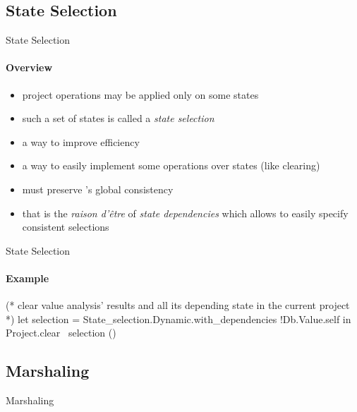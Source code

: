 
\subsection{State Selection}

\begin{frame}{State Selection}
  \framesubtitle{Overview}
  \begin{itemize}
  \item project operations may be applied only on some states
  \item such a set of states is called a \emph{state selection}
  \item a way to improve efficiency
  \item a way to easily implement some operations over states (like clearing)
  \item must preserve \framac's global consistency
  \item that is the \emph{raison d'\^etre} of \emph{state dependencies} which
    allows to easily specify consistent selections
  \end{itemize}
\end{frame}


\begin{frame}[fragile]{State Selection}
  \framesubtitle{Example}
  
  \begin{ocamlcode}
(* clear value analysis' results
   and all its depending state
   in the current project *)
let selection =
  State_selection.Dynamic.with_dependencies 
    !Db.Value.self
in
Project.clear ~selection ()
  \end{ocamlcode}

\end{frame}


\subsection{Marshaling}

\begin{frame}{Marshaling}
\end{frame}
